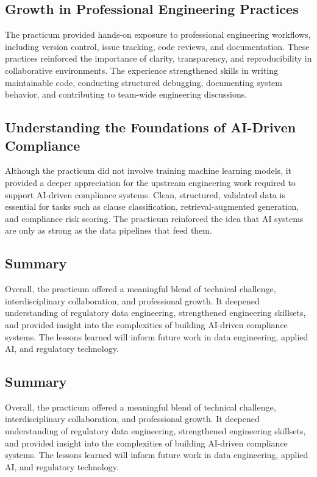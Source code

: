 \documentclass[sigconf]{acmart}
\begin{document}
\subsection{Growth in Professional Engineering Practices}

The practicum provided hands-on exposure to professional engineering workflows, including version control, issue tracking, code reviews, and documentation. These practices reinforced the importance of clarity, transparency, and reproducibility in collaborative environments. The experience strengthened skills in writing maintainable code, conducting structured debugging, documenting system behavior, and contributing to team-wide engineering discussions.

\subsection{Understanding the Foundations of AI-Driven Compliance}

Although the practicum did not involve training machine learning models, it provided a deeper appreciation for the upstream engineering work required to support AI-driven compliance systems. Clean, structured, validated data is essential for tasks such as clause classification, retrieval-augmented generation, and compliance risk scoring. The practicum reinforced the idea that AI systems are only as strong as the data pipelines that feed them.

\subsection{Summary}

Overall, the practicum offered a meaningful blend of technical challenge, interdisciplinary collaboration, and professional growth. It deepened understanding of regulatory data engineering, strengthened engineering skillsets, and provided insight into the complexities of building AI-driven compliance systems. The lessons learned will inform future work in data engineering, applied AI, and regulatory technology.

\subsection{Summary}

Overall, the practicum offered a meaningful blend of technical challenge, interdisciplinary collaboration, and professional growth. It deepened understanding of regulatory data engineering, strengthened engineering skillsets, and provided insight into the complexities of building AI-driven compliance systems. The lessons learned will inform future work in data engineering, applied AI, and regulatory technology.
\end{document}
